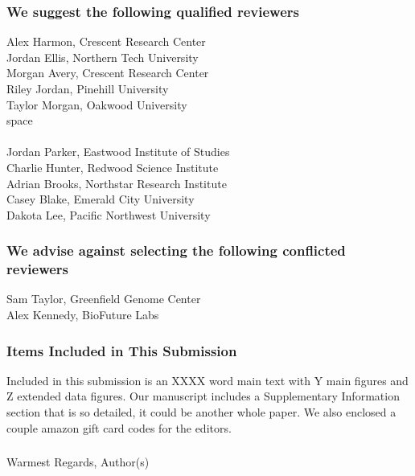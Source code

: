 \documentclass[11pt]{article}
\begin{document}
\subsubsection*{We suggest the following qualified reviewers}
\begin{multicols}{2}
\noindent Alex Harmon, Crescent Research Center\\
Jordan Ellis, Northern Tech University\\
Morgan Avery, Crescent Research Center\\
Riley Jordan, Pinehill University\\ 
Taylor Morgan, Oakwood University\\
{\color{white} space \\}\\
Jordan Parker, Eastwood Institute of Studies\\ 
Charlie Hunter, Redwood Science Institute\\ Adrian Brooks, Northstar Research Institute\\
Casey Blake, Emerald City University\\
Dakota Lee, Pacific Northwest University\\
\end{multicols}
\vspace{-0.75cm}
\subsubsection*{We advise against selecting the following conflicted reviewers}
\noindent Sam Taylor, Greenfield Genome Center\\
Alex Kennedy, BioFuture Labs

\subsubsection{Items Included in This Submission}
\noindent Included in this submission is an XXXX word main text with Y main figures and Z extended data figures. Our manuscript includes a Supplementary Information section that is so detailed, it could be another whole paper. We also enclosed a couple amazon gift card codes for the editors. 

%
\subsubsection{}
Warmest Regards,
\newline
Author(s)

\end{document}
